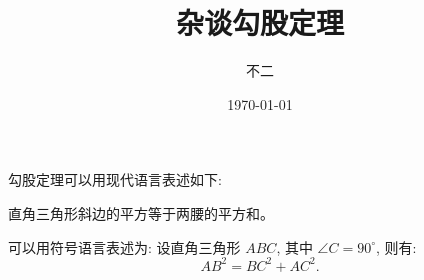 \documentclass{article}%
\title{\heiti 杂谈勾股定理}
\author{\kaisu 不二}
\date{\today}
\newcommand\degree{^\circ} %
\begin{document}
     \maketitle 

  	勾股定理可以用现代语言表述如下:

  	直角三角形斜边的平方等于两腰的平方和。

  	可以用符号语言表述为: 设直角三角形 $ABC$, 其中 $\angle C=90\degree$, 则有:
  	\begin{equation}
  	AB^2 = BC^2 + AC^2.
  	\end{equation}
  
\end{document}
